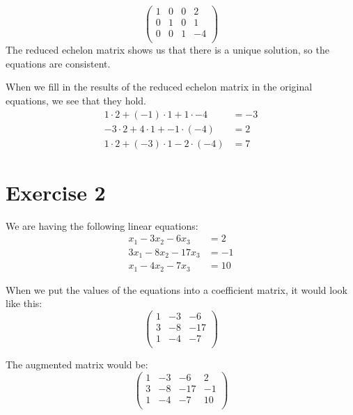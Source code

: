 \documentclass[a4paper]{article}
\begin{document}
\[
\left(
\begin{array}{ccc|c}
1 & 0 & 0 & 2   \\
0 & 1 & 0 & 1 \\
0 & 0 & 1 & -4   \\
\end{array}
\right)
\]
The reduced echelon matrix shows us that there is a unique solution, so the equations are consistent.

When we fill in the results of the reduced echelon matrix in the original equations, we see that they hold.\\
\begin{align*}
1 \cdot 2 + (-1) \cdot 1 + 1 \cdot -4 &= -3 \\
-3 \cdot 2 + 4 \cdot 1 + -1 \cdot (-4) &= 2 \\
1 \cdot 2 + (-3) \cdot 1 - 2 \cdot  (-4) &= 7
\end{align*}

\section*{Exercise 2}
We are having the following linear equations: \\
\begin{align*}
x_1 - 3x_2 - 6x_3 &= 2 \\
3x_1 - 8x_2 - 17x_3 &= -1 \\
x_1 - 4x_2 - 7x_3 &= 10
\end{align*}

When we put the values of the equations into a coefficient matrix, it would look like this: \\
\[
\left(
\begin{array}{ccc}
1 & -3 & -6   \\
3 & -8 & -17 \\
1 & -4 & -7    \\
\end{array}
\right)
\]

The augmented matrix would be:
\[
\left(
\begin{array}{ccc|c}
1 & -3 & -6 & 2   \\
3 & -8 & -17 & -1 \\
1 & -4 & -7 & 10   \\
\end{array}
\right)
\]
\end{document}
